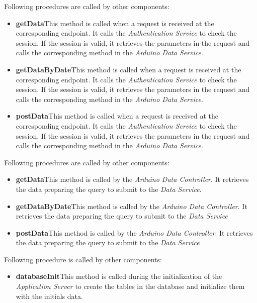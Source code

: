 Following procedures are called by other components:
\begin{itemize}
    \item \textbf{getData}\quad This method is called when a request is received at the corresponding endpoint. It calls the \textit{Authentication Service} to check the session. If the session is valid, it retrieves the parameters in the request and calls the corresponding method in the \textit{Arduino Data Service}.
    \item \textbf{getDataByDate}\quad This method is called when a request is received at the corresponding endpoint. It calls the \textit{Authentication Service} to check the session. If the session is valid, it retrieves the parameters in the request and calls the corresponding method in the \textit{Arduino Data Service}.
    \item \textbf{postData}\quad This method is called when a request is received at the corresponding endpoint. It calls the \textit{Authentication Service} to check the session. If the session is valid, it retrieves the parameters in the request and calls the corresponding method in the \textit{Arduino Data Service}.
\end{itemize}

Following procedures are called by other components:
\begin{itemize}
    \item \textbf{getData}\quad This method is called by the \textit{Arduino Data Controller}. It retrieves the data preparing the query to submit to the \textit{Data Service}.
    \item \textbf{getDataByDate}\quad This method is called by the \textit{Arduino Data Controller}. It retrieves the data preparing the query to submit to the \textit{Data Service}
    \item \textbf{postData}\quad This method is called by the \textit{Arduino Data Controller}. It retrieves the data preparing the query to submit to the \textit{Data Service}
\end{itemize}

Following procedure is called by other components:
\begin{itemize}
    \item \textbf{databaseInit}\quad This method is called during the initialization of the \textit{Application Server} to create the tables in the database and initialize them with the initials data.
\end{itemize}

